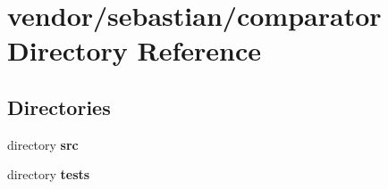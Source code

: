 \section{vendor/sebastian/comparator Directory Reference}
\label{dir_62f88168fc86da23a55ae348afc2e98d}
\subsection*{Directories}
\begin{DoxyCompactItemize}
\item 
directory {\bf src}
\item 
directory {\bf tests}
\end{DoxyCompactItemize}
